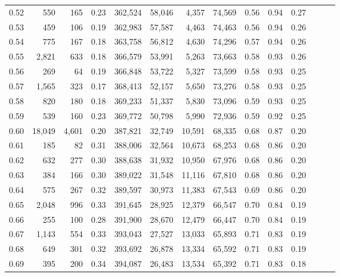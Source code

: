 \begin{tabular}{rrrrrrrrrrrrrr}
0.52 &     550 &     165 &  0.23 &  362,524 &   58,046 &   4,357 &  74,569 &  0.56 &  0.94 &      0.27 \\
0.53 &     459 &     106 &  0.19 &  362,983 &   57,587 &   4,463 &  74,463 &  0.56 &  0.94 &      0.26 \\
0.54 &     775 &     167 &  0.18 &  363,758 &   56,812 &   4,630 &  74,296 &  0.57 &  0.94 &      0.26 \\
0.55 &   2,821 &     633 &  0.18 &  366,579 &   53,991 &   5,263 &  73,663 &  0.58 &  0.93 &      0.26 \\
0.56 &     269 &      64 &  0.19 &  366,848 &   53,722 &   5,327 &  73,599 &  0.58 &  0.93 &      0.25 \\
0.57 &   1,565 &     323 &  0.17 &  368,413 &   52,157 &   5,650 &  73,276 &  0.58 &  0.93 &      0.25 \\
0.58 &     820 &     180 &  0.18 &  369,233 &   51,337 &   5,830 &  73,096 &  0.59 &  0.93 &      0.25 \\
0.59 &     539 &     160 &  0.23 &  369,772 &   50,798 &   5,990 &  72,936 &  0.59 &  0.92 &      0.25 \\
0.60 &  18,049 &   4,601 &  0.20 &  387,821 &   32,749 &  10,591 &  68,335 &  0.68 &  0.87 &      0.20 \\
0.61 &     185 &      82 &  0.31 &  388,006 &   32,564 &  10,673 &  68,253 &  0.68 &  0.86 &      0.20 \\
0.62 &     632 &     277 &  0.30 &  388,638 &   31,932 &  10,950 &  67,976 &  0.68 &  0.86 &      0.20 \\
0.63 &     384 &     166 &  0.30 &  389,022 &   31,548 &  11,116 &  67,810 &  0.68 &  0.86 &      0.20 \\
0.64 &     575 &     267 &  0.32 &  389,597 &   30,973 &  11,383 &  67,543 &  0.69 &  0.86 &      0.20 \\
0.65 &   2,048 &     996 &  0.33 &  391,645 &   28,925 &  12,379 &  66,547 &  0.70 &  0.84 &      0.19 \\
0.66 &     255 &     100 &  0.28 &  391,900 &   28,670 &  12,479 &  66,447 &  0.70 &  0.84 &      0.19 \\
0.67 &   1,143 &     554 &  0.33 &  393,043 &   27,527 &  13,033 &  65,893 &  0.71 &  0.83 &      0.19 \\
0.68 &     649 &     301 &  0.32 &  393,692 &   26,878 &  13,334 &  65,592 &  0.71 &  0.83 &      0.19 \\
0.69 &     395 &     200 &  0.34 &  394,087 &   26,483 &  13,534 &  65,392 &  0.71 &  0.83 &      0.18 \\

\end{tabular}
